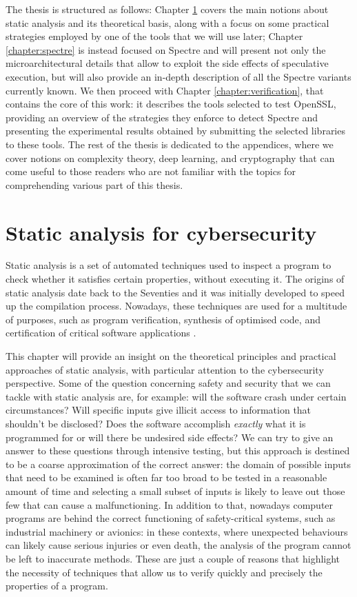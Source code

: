 \documentclass[12pt,a4paper]{book}
\theoremstyle{definition}
\begin{document}
	The thesis is structured as follows: Chapter \ref{chapter:static_analysis} covers the main notions about static analysis and its theoretical basis, along with a focus on some practical strategies employed by one of the tools that we will use later; Chapter \ref{chapter:spectre} is instead focused on Spectre and will present not only the microarchitectural details that allow to exploit the side effects of speculative execution, but will also provide an in-depth description of all the Spectre variants currently known. We then proceed with Chapter \ref{chapter:verification}, that contains the core of this work: it describes the tools selected to test OpenSSL, providing an overview of the strategies they enforce to detect Spectre and presenting the experimental results obtained by submitting the selected libraries to these tools. The rest of the thesis is dedicated to the appendices, where we cover notions on complexity theory, deep learning, and cryptography that can come useful to those readers who are not familiar with the topics for comprehending various part of this thesis.
	
	\chapter{Static analysis for cybersecurity}\label{chapter:static_analysis}
	Static analysis is a set of automated techniques used to inspect a program to check whether it satisfies certain properties, without executing it. The origins of static analysis date back to the Seventies and it was initially developed to speed up the compilation process. Nowadays, these techniques are used for a multitude of purposes, such as program verification, synthesis of optimised code, and certification of critical software applications \cite{Rival2020}. 
	
	This chapter will provide an insight on the theoretical principles and practical approaches of static analysis, with particular attention to the cybersecurity perspective. Some of the question concerning safety and security that we can tackle with static analysis are, for example: will the software crash under certain circumstances? Will specific inputs give illicit access to information that shouldn't be disclosed? Does the software accomplish \textit{exactly} what it is programmed for or will there be undesired side effects? We can try to give an answer to these questions through intensive testing, but this approach is destined to be a coarse approximation of the correct answer: the domain of possible inputs that need to be examined is often far too broad to be tested in a reasonable amount of time and selecting a small subset of inputs is likely to leave out those few that can cause a malfunctioning. In addition to that, nowadays computer programs are behind the correct functioning of safety-critical systems, such as industrial machinery or avionics: in these contexts, where unexpected behaviours can likely cause serious injuries or even death, the analysis of the program cannot be left to inaccurate methods. These are just a couple of reasons that highlight the necessity of techniques that allow us to verify quickly and precisely the properties of a program.
	
\end{document}
